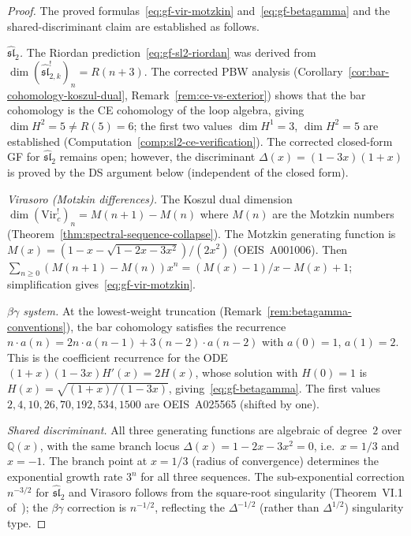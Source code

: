 \begin{proof}
The proved formulas~\eqref{eq:gf-vir-motzkin}
and~\eqref{eq:gf-betagamma} and the shared-discriminant
claim are established as follows.

\emph{$\widehat{\mathfrak{sl}}_2$.}
The Riordan prediction~\eqref{eq:gf-sl2-riordan}
was derived from
$\dim (\widehat{\mathfrak{sl}}_{2,k}^!)_n = R(n+3)$.
The corrected PBW analysis
(Corollary~\ref{cor:bar-cohomology-koszul-dual},
Remark~\ref{rem:ce-vs-exterior}) shows that the
bar cohomology is the CE cohomology of the loop algebra,
giving $\dim H^2 = 5 \neq R(5) = 6$;
the first two values $\dim H^1 = 3$, $\dim H^2 = 5$
are established
(Computation~\ref{comp:sl2-ce-verification}).
The corrected closed-form GF for
$\widehat{\mathfrak{sl}}_2$ remains open; however,
the discriminant $\Delta(x) = (1-3x)(1+x)$ is proved
by the DS argument below (independent of the closed form).

\emph{Virasoro (Motzkin differences).}
The Koszul dual dimension $\dim (\mathrm{Vir}_c^!)_n
= M(n{+}1) - M(n)$ where $M(n)$ are the Motzkin numbers
(Theorem~\ref{thm:spectral-sequence-collapse}).  The Motzkin
generating function is $M(x) = (1 - x - \sqrt{1-2x-3x^2})/(2x^2)$
(OEIS~A001006).  Then
$\sum_{n \geq 0}(M(n{+}1) - M(n))x^n = (M(x) - 1)/x - M(x) + 1$;
simplification gives~\eqref{eq:gf-vir-motzkin}.

\emph{$\beta\gamma$ system.}
At the lowest-weight truncation
(Remark~\ref{rem:betagamma-conventions}), the bar cohomology
satisfies the recurrence
$n \cdot a(n) = 2n \cdot a(n{-}1) + 3(n{-}2) \cdot a(n{-}2)$
with $a(0) = 1$, $a(1) = 2$.  This is the coefficient recurrence
for the ODE $(1{+}x)(1{-}3x)H'(x) = 2H(x)$, whose solution with
$H(0) = 1$ is $H(x) = \sqrt{(1{+}x)/(1{-}3x)}$,
giving~\eqref{eq:gf-betagamma}.
The first values $2, 4, 10, 26, 70, 192, 534, 1500$
are OEIS~A025565 (shifted by one).

\emph{Shared discriminant.}
All three generating functions are algebraic of degree~$2$ over
$\mathbb{Q}(x)$, with the same branch locus
$\Delta(x) = 1 - 2x - 3x^2 = 0$, i.e.\ $x = 1/3$ and $x = -1$.
The branch point at $x = 1/3$ (radius of convergence) determines the
exponential growth rate $3^n$ for all three sequences.
The sub-exponential correction $n^{-3/2}$ for
$\widehat{\mathfrak{sl}}_2$ and Virasoro follows from the
square-root singularity
(Theorem~VI.1 of~\cite{FlajoletSedgewick});
the $\beta\gamma$ correction is $n^{-1/2}$, reflecting the
$\Delta^{-1/2}$ (rather than $\Delta^{1/2}$) singularity type.


\end{proof}

